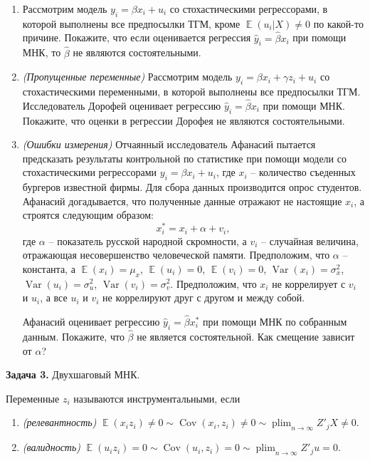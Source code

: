 \documentclass[10pt, a4paper]{extarticle}
\DeclareMathOperator*\plim{plim}
\DeclareMathOperator{\cov}{Cov}
\DeclareMathOperator{\Var}{Var}
\DeclareMathOperator{\E}{\mathbb{E}}
\begin{document}
	\begin{enumerate}[label=\alph*)]
		\item Рассмотрим модель $y_i = \beta x_i + u_i$ со стохастическими регрессорами, в которой выполнены все предпосылки ТГМ, кроме $\E(u_i | X) \ne 0$ по какой-то причине. Покажите, что если оценивается регрессия $\hat{y}_i = \hat{\beta}x_i$ при помощи МНК, то $\hat{\beta}$ не являются состоятельными.
		\item \textit{(Пропущенные переменные)} Рассмотрим модель $y_i = \beta x_i + \gamma z_i + u_i$ со стохастическими переменными, в которой выполнены все предпосылки ТГМ. Исследователь Дорофей оценивает регрессию $\hat{y}_i = \hat{\beta}x_i$ при помощи МНК. Покажите, что оценки в регрессии Дорофея не являются состоятельными.
		\item \textit{(Ошибки измерения)} Отчаянный исследователь Афанасий пытается предсказать результаты контрольной по статистике при помощи модели со стохастическими регрессорами $y_i = \beta x_i + u_i$, где $x_i$ -- количество съеденных бургеров известной фирмы. Для сбора данных производится опрос студентов. Афанасий догадывается, что полученные данные отражают не настоящие $x_i$, а строятся следующим образом:
		\[
		x_i^* = x_i + \alpha + v_i,
		\]
		где $\alpha$ -- показатель русской народной скромности, а $v_i$ -- случайная величина, отражающая несовершенство человеческой памяти. Предположим, что $\alpha$ -- константа, а $\E(x_i) = \mu_x$, $\E(u_i) = 0$, $\E(v_i) = 0$, $\Var(x_i) = \sigma^2_x$, $\Var(u_i) = \sigma^2_u$, $\Var(v_i) = \sigma^2_v$. Предположим, что $x_i$ не коррелирует с $v_i$ и $u_i$, а все $u_i$ и $v_i$ не коррелируют друг с другом и между собой.
		
		Афанасий оценивает регрессию $\hat{y}_i = \hat{\beta} x^*_i$ при помощи МНК по собранным данным. Покажите, что $\hat{\beta}$ не является состоятельной. Как смещение зависит от $\alpha$?
		
	\end{enumerate}
	\vspace{1em}
	
	{\Large \textbf{Задача 3.} Двухшаговый МНК.}
	
	Переменные $z_i$ называются инструментальными, если 
	\begin{enumerate}
		\item \textit{(релевантность)} $\E(x_iz_i) \ne 0 \sim \cov(x_i, z_i) \ne 0 \sim \plim_{n \to \infty} Z'_jX \ne 0$.
		\item \textit{(валидность)} $\E(u_iz_i) = 0 \sim \cov(u_i, z_i) = 0 \sim \plim_{n \to \infty} Z'_ju = 0$.
	\end{enumerate}
\end{document}
